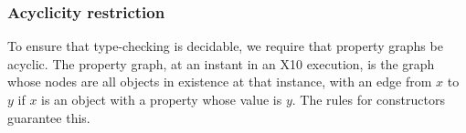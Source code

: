 

\subsubsection{Acyclicity restriction}

To ensure that type-checking is decidable, we require that property graphs be
acyclic.  The property graph, at an instant in an X10 execution, is the graph
whose nodes are all objects in existence at that instance, with an edge from
{$x$} to {$y$} if {$x$} is an object with a property whose value is {$y$}. 
The rules for constructors guarantee this.

